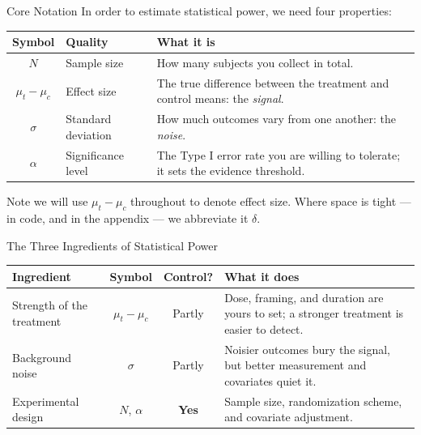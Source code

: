\documentclass[
  ignorenonframetext,
  aspectratio=169,
]{beamer}
\begin{document}
\begin{frame}{Core Notation}
\label{core-notation}
In order to estimate statistical power, we need four properties:

\vspace{0.5em}

\begin{center}
\small
\setlength{\tabcolsep}{7pt}
\renewcommand{\arraystretch}{1.35}
\begin{tabular}{c>{\raggedright\arraybackslash}p{3.1cm}>{\raggedright\arraybackslash}p{7.9cm}}
\toprule
\textbf{Symbol} & \textbf{Quality} & \textbf{What it is} \\
\midrule
$N$              & Sample size        & How many subjects you collect in total. \\
$\mu_t - \mu_c$  & Effect size        & The true difference between the treatment and control means: the \textit{signal}. \\
$\sigma$         & Standard deviation & How much outcomes vary from one another: the \textit{noise}. \\
$\alpha$         & Significance level & The Type I error rate you are willing to tolerate; it sets the evidence threshold. \\
\bottomrule
\end{tabular}
\end{center}

\vspace{0.4em}

\begin{center}
\small Note we will use $\mu_t - \mu_c$ throughout to denote effect size. Where space is tight --- in code, and in the appendix --- we abbreviate it $\delta$. 
\end{center}
\end{frame}

\begin{frame}{The Three Ingredients of Statistical Power}
\label{the-three-ingredients-of-statistical-power}
\vspace{0.5em}

\begin{center}
\small
\setlength{\tabcolsep}{7pt}
\renewcommand{\arraystretch}{1.35}
\begin{tabular}{>{\raggedright\arraybackslash}p{3.3cm}cc>{\raggedright\arraybackslash}p{6.2cm}}
\toprule
\textbf{Ingredient} & \textbf{Symbol} & \textbf{Control?} & \textbf{What it does} \\
\midrule
Strength of the treatment & $\mu_t - \mu_c$ & Partly & Dose, framing, and duration are yours to set; a stronger treatment is easier to detect. \\
Background noise & $\sigma$ & Partly & Noisier outcomes bury the signal, but better measurement and covariates quiet it. \\
Experimental design & $N$, $\alpha$ & \textbf{Yes} & Sample size, randomization scheme, and covariate adjustment. \\
\bottomrule
\end{tabular}
\end{center}
\end{frame}
\end{document}
